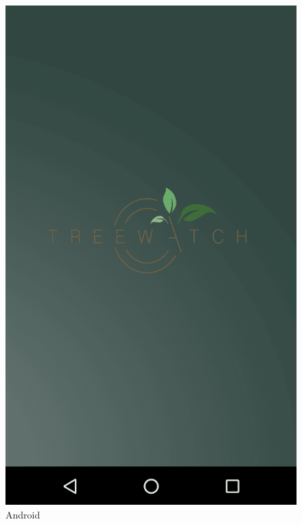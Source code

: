 \documentclass[12pt]{article}
\begin{document}
\begin{figure}[ht]
	\includegraphics[width=\linewidth, height=0.4\textheight, keepaspectratio=true, frame]{screenshots/LoadAnd.png}
	\caption{Android}
	\endminipage\hfill
\end{figure}
\clearpage
\end{document}
